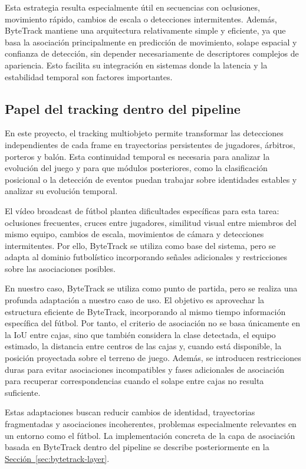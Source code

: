 Esta estrategia resulta especialmente útil en secuencias con oclusiones, movimiento rápido, cambios de escala o detecciones intermitentes. Además, ByteTrack mantiene una arquitectura relativamente simple y eficiente, ya que basa la asociación principalmente en predicción de movimiento, solape espacial y confianza de detección, sin depender necesariamente de descriptores complejos de apariencia. Esto facilita su integración en sistemas donde la latencia y la estabilidad temporal son factores importantes.

\subsection{Papel del tracking dentro del pipeline}

En este proyecto, el tracking multiobjeto permite transformar las detecciones independientes de cada frame en trayectorias persistentes de jugadores, árbitros, porteros y balón. Esta continuidad temporal es necesaria para analizar la evolución del juego y para que módulos posteriores, como la clasificación posicional o la detección de eventos puedan trabajar sobre identidades estables y analizar su evolución temporal.

El vídeo broadcast de fútbol plantea dificultades específicas para esta tarea: oclusiones frecuentes, cruces entre jugadores, similitud visual entre miembros del mismo equipo, cambios de escala, movimientos de cámara y detecciones intermitentes. Por ello, ByteTrack se utiliza como base del sistema, pero se adapta al dominio futbolístico incorporando señales adicionales y restricciones sobre las asociaciones posibles.

En nuestro caso, ByteTrack se utiliza como punto de partida, pero se realiza una profunda adaptación a nuestro caso de uso. El objetivo es aprovechar la estructura eficiente de ByteTrack, incorporando al mismo tiempo información específica del fútbol. Por tanto, el criterio de asociación no se basa únicamente en la IoU entre cajas, sino que también considera la clase detectada, el equipo estimado, la distancia entre centros de las cajas y, cuando está disponible, la posición proyectada sobre el terreno de juego. Además, se introducen restricciones duras para evitar asociaciones incompatibles y fases adicionales de asociación para recuperar correspondencias cuando el solape entre cajas no resulta suficiente.

Estas adaptaciones buscan reducir cambios de identidad, trayectorias fragmentadas y asociaciones incoherentes, problemas especialmente relevantes en un entorno como el fútbol. La implementación concreta de la capa de asociación basada en ByteTrack dentro del pipeline se describe posteriormente en la \hyperref[sec:bytetrack-layer]{Sección~\ref*{sec:bytetrack-layer}}.